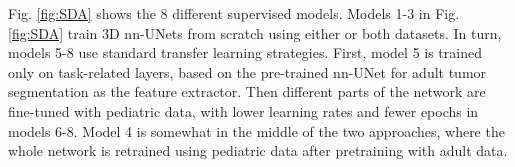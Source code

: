 \documentclass[runningheads]{llncs}
\begin{document}
Fig. \ref{fig:SDA} shows the 8 different supervised models. Models 1-3 in Fig. \ref{fig:SDA} train 3D nn-UNets from scratch using either or both datasets. In turn, models 5-8 use standard transfer learning strategies. First, model 5 is trained only on task-related layers, based on the pre-trained nn-UNet for adult tumor segmentation as the feature extractor. Then different parts of the network are fine-tuned with pediatric data, with lower learning rates and fewer epochs in models 6-8. Model 4 is somewhat in the middle of the two approaches, where the whole network is retrained using pediatric data after pretraining with adult data. %





\end{document}
